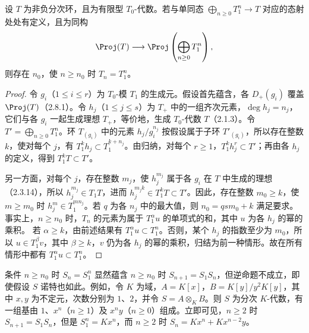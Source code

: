 设 $T$ 为非负分次环，且为有限型 $T_0$-代数。若与单同态 $\bigoplus_{n\geq0}T_1^n\to T$ 对应的态射处处有定义，且为同构
\[
\Proj(T)\longrightarrow\Proj\left(\bigoplus_{n\geq0}T_1^n\right),
\]
则存在 $n_0$，使 $n\geq n_0$ 时 $T_n=T_1^n$。
\begin{proof}
令 $g_i$（$1\leq i\leq r$）为 $T_0$-模 $T_1$ 的生成元。假设首先蕴含，各 $D_+(g_i)$ 覆盖 $\Proj(T)$（2.8.1）。令 $h_j$（$1\leq j\leq s$）为 $T_+$ 中的一组齐次元素，$\deg h_j=n_j$，它们与各 $g_i$ 一起生成理想 $T_+$，等价地，生成 $T_0$-代数 $T$（2.1.3）。令 $T'=\bigoplus_{n\geq0}T_1^n$。环 $T_{(g_i)}$ 中的元素 $h_j/g_i^{n_j}$ 按假设属于子环 $T'_{(g_i)}$，所以存在整数 $k$，使对每个 $j$，有 $T_1^kh_j\subset T_1^{k+n_j}$。由归纳，对每个 $r\geq1$，$T_1^kh_j^r\subset T'$；再由各 $h_j$ 的定义，得到 $T_1^kT\subset T'$。

另一方面，对每个 $j$，存在整数 $m_j$，使 $h_j^{m_j}$ 属于各 $g_i$ 在 $T$ 中生成的理想（2.3.14），所以 $h_j^{m_j}\in T_1T$，进而 $h_j^{m_jk}\in T_1^kT\subset T'$。因此，存在整数 $m_0\geq k$，使 $m\geq m_0$ 时 $h_j^m\in T_1^{mn_j}$。若 $q$ 为各 $n_j$ 中的最大值，则 $n_0=qsm_0+k$ 满足要求。事实上，$n\geq n_0$ 时，$T_n$ 的元素为属于 $T_1^\alpha u$ 的单项式的和，其中 $u$ 为各 $h_j$ 的幂的乘积。
若 $\alpha\geq k$，由前述结果有 $T_1^\alpha u\subset T_1^n$。否则，某个 $h_j$ 的指数至少为 $m_0$，所以 $u\in T_1^\beta v$，其中 $\beta\geq k$，$v$ 仍为各 $h_j$ 的幂的乘积，归结为前一种情形。故在所有情形中都有 $T_1^\alpha u\subset T_1^n$。
\end{proof}

条件 $n\geq n_0$ 时 $S_n=S_1^n$ 显然蕴含 $n\geq n_0$ 时 $S_{n+1}=S_1S_n$，但逆命题不成立，即使假设 $S$ 诺特也如此。例如，令 $K$ 为域，$A=K[x]$，$B=K[y]/y^2K[y]$，其中 $x,y$ 为不定元，次数分别为 $1$、$2$，并令 $S=A\otimes_K B$。则 $S$ 为分次 $K$-代数，有一组基由 $1$、$x^n$（$n\geq1$）及 $x^ny$（$n\geq0$）组成。立即可见，$n\geq2$ 时 $S_{n+1}=S_1S_n$，但是 $S_1^n=Kx^n$，而 $n\geq2$ 时 $S_n=Kx^n+Kx^{n-2}y$。


